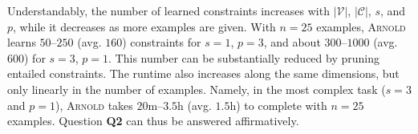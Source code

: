\documentclass{article}
\newcommand{\learner}{\textsc{Arnold}\xspace}
\newcommand{\variables}{\ensuremath{\mathcal{V}}\xspace}
\newcommand{\constants}{\ensuremath{\mathcal{C}}\xspace}
\renewcommand\[{\begin{equation}}
\renewcommand\]{\end{equation}}
\begin{document}
Understandably, the number of learned constraints increases with
$|\variables|$, $|\constants|$, $s$, and $p$, while it decreases as more
examples are given.  With $n = 25$ examples, \learner learns $50$--$250$ (avg.
$160$) constraints for $s=1$, $p=3$, and about $300$--$1000$ (avg. $600$) for
$s=3$, $p=1$.  This number can be substantially reduced by pruning entailed
constraints.
%
The runtime also increases along the same dimensions, but only linearly in the
number of examples.  Namely, in the most complex task ($s=3$ and $p=1$),
\learner takes $20$m--$3.5$h (avg.  $1.5$h) to complete with $n=25$ examples.
Question \textbf{Q2} can thus be answered affirmatively.

\end{document}
